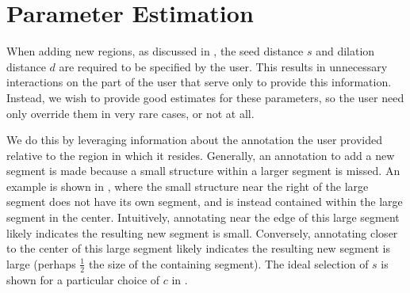 \documentclass[]{spie}  %
\begin{document}
\section{Parameter Estimation}
\label{sec:param}

When adding new regions, as discussed in , the seed
distance $s$ and dilation distance $d$ are required to be specified by
the user.  This results in unnecessary interactions on the part of the
user that serve only to provide this information.  Instead, we wish to
provide good estimates for these parameters, so the user need only
override them in very rare cases, or not at all.

We do this by leveraging information about the annotation the user
provided relative to the region in which it resides.  Generally, an
annotation to add a new segment is made because a small structure
within a larger segment is missed.  An example is shown in
, where the small structure near the right of the
large segment does not have its own segment, and is instead contained
within the large segment in the center.  Intuitively, annotating near
the edge of this large segment likely indicates the resulting new
segment is small.  Conversely, annotating closer to the center of this
large segment likely indicates the resulting new segment is large
(perhaps $\frac{1}{2}$ the size of the containing segment).  The ideal
selection of $s$ is shown for a particular choice of $c$ in
.
\begin{figure}[htbp]
\centering
{}
\hspace{0.1em}
\hspace{0.1em}
\caption{} \label{fig:param}
\end{figure}
\end{document}
